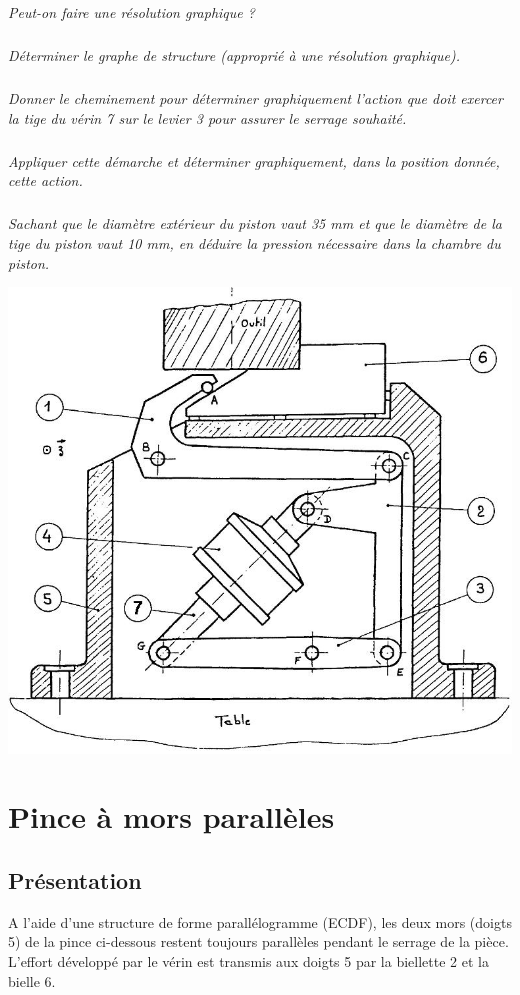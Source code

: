 \documentclass[10pt]{article}
\begin{document}
\subparagraph{}
\textit{Peut-on faire une résolution graphique ?}

\subparagraph{}
\textit{Déterminer le graphe de structure (approprié à une résolution graphique). }

\subparagraph{}
\textit{Donner le cheminement pour déterminer graphiquement l’action que doit exercer la tige du 
vérin 7 sur le levier 3 pour assurer le serrage souhaité. }

\subparagraph{}
\textit{Appliquer cette démarche et déterminer graphiquement, dans la position donnée, cette action.}

\subparagraph{}
\textit{Sachant que le diamètre extérieur du piston vaut 35 mm et que le diamètre de la tige du 
piston vaut 10 mm, en déduire la pression nécessaire dans la chambre du piston. }



\begin{center}
\includegraphics[width=.8\textwidth]{images/fig_01}
\end{center}


\newpage
\section*{Pince à mors parallèles}
\setcounter{subparagraph}{0}
\subsection*{Présentation}

A l’aide d’une structure de forme parallélogramme (ECDF), les deux mors (doigts 5) de la pince ci-dessous 
restent toujours parallèles pendant le serrage de la pièce. 
L’effort développé par le vérin est transmis aux doigts 5 par la biellette 2 et la bielle 6. 
\end{document}
